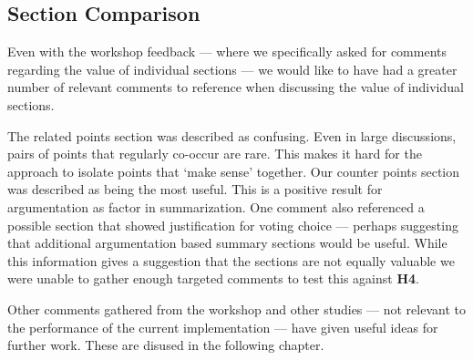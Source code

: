    \tocless\subsection{Section Comparison}
      Even with the workshop feedback --- where we specifically asked for comments regarding the value of individual sections --- we would like to have had a greater number of relevant comments to reference when discussing the value of individual sections.

			The related points section was described as confusing. Even in large discussions, pairs of points that regularly co-occur are rare. This makes it hard for the approach to isolate points that `make sense' together. Our counter points section was described as being the most useful. This is a positive result for argumentation as factor in summarization. One comment also referenced a possible section that showed justification for voting choice --- perhaps suggesting that additional argumentation based summary sections would be useful. While this information gives a suggestion that the sections are not equally valuable we were unable to gather enough targeted comments to test this against \textbf{H4}.

      Other comments gathered from the workshop and other studies --- not relevant to the performance of the current implementation --- have given useful ideas for further work. These are disused in the following chapter.
